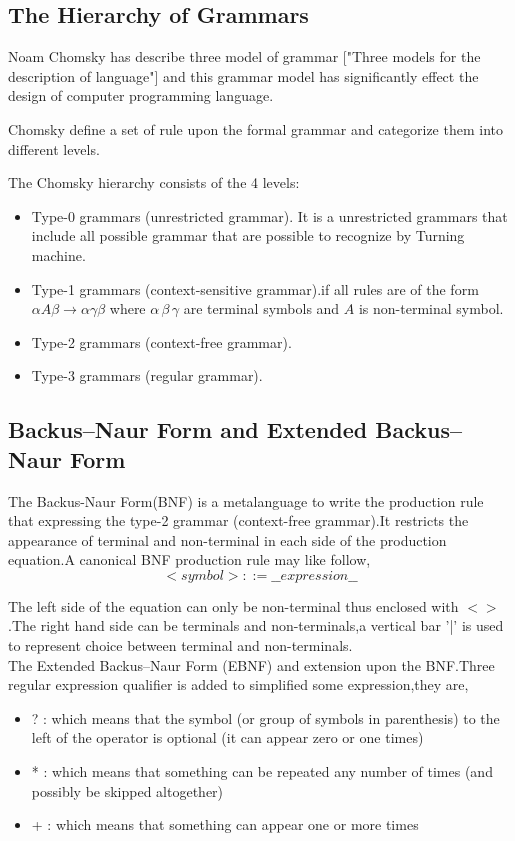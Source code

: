 \subsection{The Hierarchy of Grammars}
Noam Chomsky has describe three model of grammar ["Three models for the description of language"]  and this grammar model has significantly effect the design of computer programming language.


Chomsky define a set of rule upon the formal grammar and categorize them into different levels.

The Chomsky hierarchy consists of the 4 levels:
\begin{itemize}
\item Type-0 grammars (unrestricted grammar). It is a unrestricted grammars that include all possible grammar that are possible to recognize by Turning machine.
\item Type-1 grammars (context-sensitive grammar).if all rules are of the form $  \alpha A \beta \rightarrow \alpha \gamma \beta$ where $ \alpha \,  \beta \, \gamma $ are terminal symbols and $ A $ is non-terminal symbol.
\item Type-2 grammars (context-free grammar). 
\item Type-3 grammars (regular grammar).
\end{itemize}

\subsection {Backus–Naur Form and Extended Backus–Naur Form}
The Backus-Naur Form(BNF) is a metalanguage to write the production rule that expressing the type-2 grammar (context-free grammar).It  restricts the appearance of terminal and non-terminal in each side of the production equation.A canonical BNF production rule may like follow,
 \[   <symbol> ::= \_\_expression\_\_ \]
 
The left side of the equation can only be non-terminal thus enclosed with $<>$ .The right hand side can be terminals and non-terminals,a vertical bar '|' is used to represent choice between terminal and non-terminals.\\

The  Extended Backus–Naur Form (EBNF) and extension upon the BNF.Three regular expression qualifier is added to simplified some expression,they are,
\begin{itemize}
\item ? : which means that the symbol (or group of symbols in parenthesis) to the left of the operator is
optional (it can appear zero or one times)
\item * : which means that something can be repeated any number of times (and possibly be skipped
altogether)
\item + : which means that something can appear one or more times 
\end{itemize} \cite{book}

